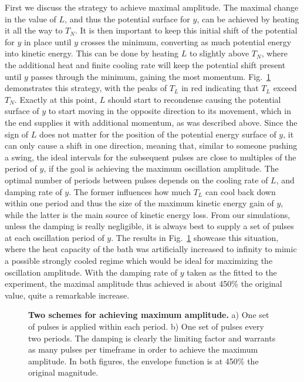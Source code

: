 First we discuss the strategy to achieve maximal amplitude.
The maximal change in the value of $L$, and thus the potential surface for $y$, can be achieved by heating it all the way to $T_N$.
It is then important to keep this initial shift of the potential for $y$ in place until $y$ crosses the minimum, converting as much potential energy into kinetic energy.
This can be done by heating $L$ to slightly above $T_N$, where the additional heat and finite cooling rate will keep the potential shift present until $y$ passes through the minimum, gaining the most momentum.
Fig.~\ref{fig:Cr_maximum_amp} demonstrates this strategy, with the peaks of $T_L$ in red indicating that $T_L$ exceed $T_N$.
Exactly at this point, $L$ should start to recondense causing the potential surface of $y$ to start moving in the opposite direction to its movement, which in the end supplies it with additional momentum, as was described above.
Since the sign of $L$ does not matter for the position of the potential energy surface of $y$, it can only cause a shift in one direction, meaning that, similar to someone pushing a swing, the ideal intervals for the subsequent pulses are close to multiples of the period of $y$, if the goal is achieving the maximum oscillation amplitude.
The optimal number of periods between pulses depends on the cooling rate of $L$, and damping rate of $y$.
The former influences how much $T_L$ can cool back down within one period and thus the size of the maximum kinetic energy gain of $y$, while the latter is the main source of kinetic energy loss. From our simulations, unless the damping is really negligible, it is always best to supply a set of pulses at each oscillation period of $y$.
The results in Fig.~\ref{fig:Cr_maximum_amp} showcase this situation, where the heat capacity of the bath was artificially increased to infinity to mimic a possible strongly cooled regime which would be ideal for maximizing the oscillation amplitude.
With the damping rate of $y$ taken as the fitted to the experiment, the maximal amplitude thus achieved is about 450\% the original value, quite a remarkable increase.  
\begin{figure}
	\caption{\label{fig:Cr_maximum_amp} {\bf Two schemes for achieving maximum amplitude.} a) One set of pulses is applied within each period. b) One set of pulses every two periods. The damping is clearly the limiting factor and warrants as many pulses per timeframe in order to achieve the maximum amplitude. In both figures, the envelope function is at 450\% the original magnitude.}
\end{figure}

